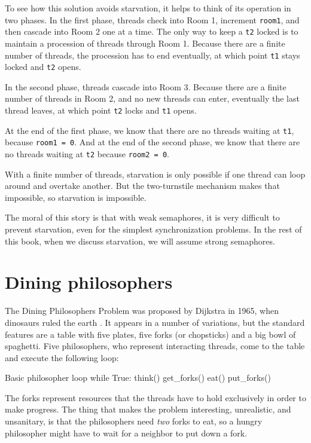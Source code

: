 To see how this solution avoids starvation, it helps to think of its
operation in two phases.  In the first phase, threads check into Room
1, increment {\tt room1}, and then cascade into Room 2 one at a time.
The only way to keep a {\tt t2} locked is to maintain a
procession of threads through Room 1.  Because there are a finite
number of threads, the procession has to end eventually, at which
point {\tt t1} stays locked and {\tt t2} opens.

In the second phase, threads cascade into Room 3.  
Because there are a finite number of threads in Room 2, and
no new threads can enter, eventually the last thread leaves, at
which point {\tt t2} locks and {\tt t1} opens.

At the end of the first phase, we know that there are no threads
waiting at {\tt t1}, because {\tt room1 = 0}.  And at the end of the
second phase, we know that there are no threads waiting at {\tt t2}
because {\tt room2 = 0}.

With a finite number of threads, starvation is only possible if one
thread can loop around and overtake another.  But the two-turnstile
mechanism makes that impossible, so starvation is impossible.

The moral of this story is that with weak semaphores, it is very
difficult to prevent starvation, even for the simplest synchronization
problems.  In the rest of this book, when we discuss starvation, we
will assume strong semaphores.


\newpage
\section{Dining philosophers}
\label{dining}

The Dining Philosophers Problem was proposed by Dijkstra in
1965, when dinosaurs ruled the earth \cite{dijkstra65}.  It
appears in a number of variations, but the standard features
are a table with five plates, five forks (or chopsticks) and
a big bowl of spaghetti.  Five philosophers, who represent
interacting threads, come to the table and execute the
following loop:

\begin{lstbox}{Basic philosopher loop}
while True:
   think()
   get_forks()
   eat()
   put_forks()
\end{lstbox}

The forks represent resources that the threads have to hold
exclusively in order to make progress.  The thing that makes the
problem interesting, unrealistic, and unsanitary, is that the
philosophers need {\em two} forks to eat, so a hungry philosopher
might have to wait for a neighbor to put down a fork.

